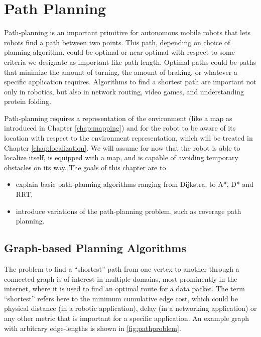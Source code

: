 \chapter{Path Planning}\label{chap:pathplanning}
Path-planning is an important primitive for autonomous mobile robots that lets robots find a path between two points. This path, depending on choice of planning algorithm, could be optimal or near-optimal with respect to some criteria we designate as important like path length. Optimal paths could be paths that minimize the amount of turning, the amount of braking, or whatever a specific application requires. Algorithms to find a shortest path are important not only in robotics, but also in network routing, video games, and understanding protein folding.

Path-planning requires a representation of the environment (like a map as introduced in Chapter \ref{chap:mapping}) and for the robot to be aware of its location with respect to the environment representation, which will be treated in Chapter \ref{chap:localization}. We will assume for now that the robot is able to localize itself, is equipped with a map, and is capable of avoiding temporary obstacles on its way. The goals of this chapter are to

\begin{itemize}
\item explain basic path-planning algorithms  ranging from Dijkstra, to A*, D* and RRT,
\item introduce variations of the path-planning problem, such as coverage path planning.
\end{itemize}


\section{Graph-based Planning Algorithms}

The problem to find a ``shortest'' path from one vertex to another through a connected graph is of interest in multiple domains, most prominently in the internet, where it is used to find an optimal route for a data packet. The term ``shortest'' refers here to the minimum cumulative edge cost, which could be physical distance (in a robotic application), delay (in a networking application) or any other metric that is important for a specific application. An example graph with arbitrary edge-lengths is shown in \cref{fig:pathproblem}.

